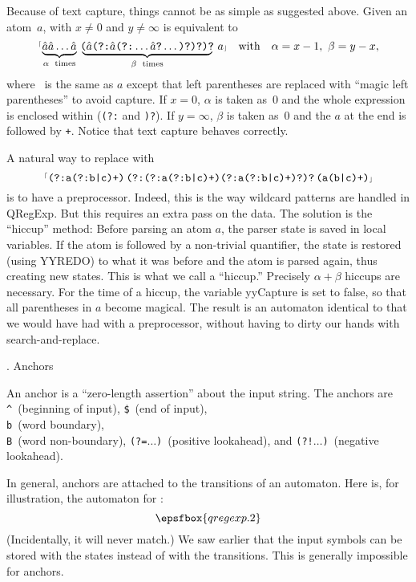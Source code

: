 Because of text capture, things cannot be as simple as suggested above.  Given an atom~$a$,  with $x \ne 0$ and $y \ne \infty$ is equivalent to $$\hbox{\rx{$\underbrace{\hbox{\haha\haha}\ldots\hbox{\haha\vphantom)}}_{\alpha\rm\ times}\,\,\underbrace{\!\hbox{(\haha(?:\haha(?:}\ldots\hbox{\haha?}\ldots\hbox{)?)?)?}\!}_{\beta\rm\ times}\,\,a$}} \quad \hbox{with} \quad \alpha = x - 1,\ \beta = y - x,$$ where \haha~is the same as $a$ except that left parentheses are replaced with ``magic left parentheses'' to avoid capture.  If $x = 0$, $\alpha$ is taken as~$0$ and the whole expression is enclosed within ({\tt (?:} and {\tt )?}).  If $y = \infty$, $\beta$ is taken as~$0$ and the $a$ at the end is followed by {\tt +}.  Notice that text capture behaves correctly.

A natural way to replace  with $$\hbox{{$^{\scriptscriptstyle\lceil}$\tt(?:a(?:b|c)+)$\,$(?:(?:a(?:b|c)+)(?:a(?:b|c)+)?)?$\,$(a(b|c)+)$\scriptscriptstyle\rfloor$}}$$ is to have a preprocessor.  Indeed, this is the way wildcard patterns are handled in {\sf QRegExp}.  But this requires an extra pass on the data.  The solution is the ``hiccup'' method:  Before parsing an atom $a$, the parser state is saved in local variables.  If the atom is followed by a non-trivial quantifier, the state is restored (using {\sf YYREDO}) to what it was before and the atom is parsed again, thus creating new states.  This is what we call a ``hiccup.''  Precisely $\alpha + \beta$ hiccups are necessary.  For the time of a hiccup, the variable {\sf yyCapture} is set to {\sf false}, so that all parentheses in $a$ become magical.  The result is an automaton identical to that we would have had with a preprocessor, without having to dirty our hands with search-and-replace.

. Anchors

An anchor is a ``zero-length assertion'' about the input string.  The anchors are {\tt\^}~(beginning of input), {\tt\$}~(end of input), {\tt\\b}~(word boundary), {\tt\\B}~(word non-boundary), {\tt(?=}$\ldots${\tt)}~(positive lookahead), and {\tt(?!}$\ldots${\tt)}~(negative lookahead).

In general, anchors are attached to the transitions of an automaton.  Here is, for illustration, the automaton for :  $$\epsfbox{qregexp.2}$$  (Incidentally, it will never match.)  We saw earlier that the input symbols can be stored with the states instead of with the transitions.  This is generally impossible for anchors.

